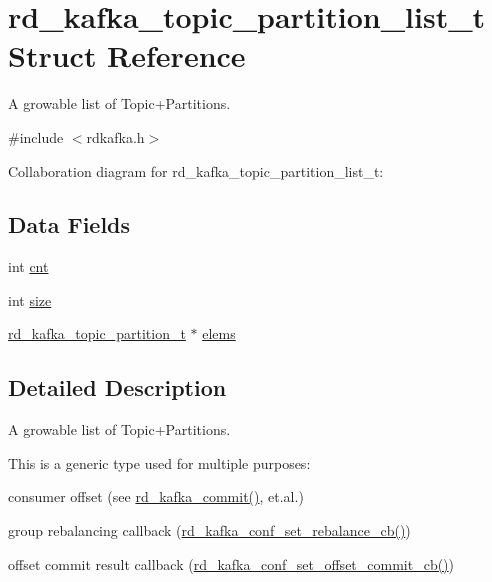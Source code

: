 \hypertarget{structrd__kafka__topic__partition__list__t}{\section{rd\-\_\-kafka\-\_\-topic\-\_\-partition\-\_\-list\-\_\-t Struct Reference}
\label{structrd__kafka__topic__partition__list__t}
}


A growable list of Topic+\-Partitions.  




{\ttfamily \#include $<$rdkafka.\-h$>$}



Collaboration diagram for rd\-\_\-kafka\-\_\-topic\-\_\-partition\-\_\-list\-\_\-t\-:
\subsection*{Data Fields}
\begin{DoxyCompactItemize}
\item 
int \hyperlink{structrd__kafka__topic__partition__list__t_a3b9ea691a2ecea3774a7e994c8c0c805}{cnt}
\item 
int \hyperlink{structrd__kafka__topic__partition__list__t_a476e475526035de7b10cd79991771d57}{size}
\item 
\hyperlink{structrd__kafka__topic__partition__t}{rd\-\_\-kafka\-\_\-topic\-\_\-partition\-\_\-t} $\ast$ \hyperlink{structrd__kafka__topic__partition__list__t_acf0fc06547578cd074423565440b58da}{elems}
\end{DoxyCompactItemize}


\subsection{Detailed Description}
A growable list of Topic+\-Partitions. 

This is a generic type used for multiple purposes\-:
\begin{DoxyItemize}
\item consumer offset (see \hyperlink{rdkafka_8h_ab96539928328f14c3c9177ea0c896c87}{rd\-\_\-kafka\-\_\-commit()}, et.\-al.)
\item group rebalancing callback (\hyperlink{rdkafka_8h_a10db731dc1a295bd9884e4f8cb199311}{rd\-\_\-kafka\-\_\-conf\-\_\-set\-\_\-rebalance\-\_\-cb()})
\item offset commit result callback (\hyperlink{rdkafka_8h_a1ab8bb9e8d8cdd5906f9e060b506f2eb}{rd\-\_\-kafka\-\_\-conf\-\_\-set\-\_\-offset\-\_\-commit\-\_\-cb()}) 
\end{DoxyItemize}

